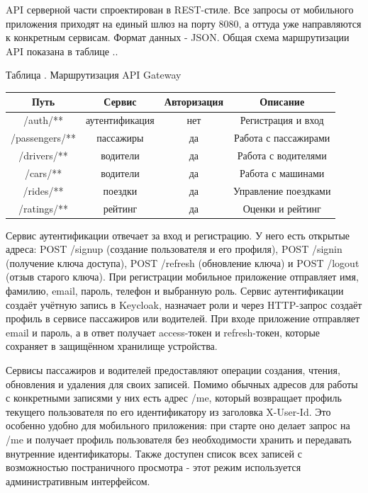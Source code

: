 {\gostFont
	
	\par \redline API серверной части спроектирован в REST-стиле. Все запросы от мобильного приложения приходят на единый шлюз на порту 8080, а оттуда уже направляются к конкретным сервисам. Формат данных - JSON. Общая схема маршрутизации API показана в таблице \thechaptercntr .\thetablecntr.
	
	\topTablespace
	{\begin{Center}
			\par Таблица \thechaptercntr .\thetablecntr \spc {--} Маршрутизация API Gateway
			
			\begin{tabular}{|c|c|c|c|}
				\hline
				Путь & Сервис & Авторизация & Описание \\ \hline
				/auth/** & аутентификация & нет & Регистрация и вход \\ \hline
				/passengers/** & пассажиры & да & Работа с пассажирами \\ \hline
				/drivers/** & водители & да & Работа с водителями \\ \hline
				/cars/** & водители & да & Работа с машинами \\ \hline
				/rides/** & поездки & да & Управление поездками \\ \hline
				/ratings/** & рейтинг & да & Оценки и рейтинг \\ \hline
		\end{tabular} \end{Center}}
	\botTablespace \addtocounter{tablecntr}{1}
	
	\par \redline Сервис аутентификации отвечает за вход и регистрацию. У него есть открытые адреса: POST /signup (создание пользователя и его профиля), POST /signin (получение ключа доступа), POST /refresh (обновление ключа) и POST /logout (отзыв старого ключа). При регистрации мобильное приложение отправляет имя, фамилию, email, пароль, телефон и выбранную роль. Сервис аутентификации создаёт учётную запись в Keycloak, назначает роли и через HTTP-запрос создаёт профиль в сервисе пассажиров или водителей. При входе приложение отправляет email и пароль, а в ответ получает access-токен и refresh-токен, которые сохраняет в защищённом хранилище устройства.
	
	\par \redline Сервисы пассажиров и водителей предоставляют операции создания, чтения, обновления и удаления для своих записей. Помимо обычных адресов для работы с конкретными записями у них есть адрес /me, который возвращает профиль текущего пользователя по его идентификатору из заголовка X-User-Id. Это особенно удобно для мобильного приложения: при старте оно делает запрос на /me и получает профиль пользователя без необходимости хранить и передавать внутренние идентификаторы. Также доступен список всех записей с возможностью постраничного просмотра - этот режим используется административным интерфейсом.
	
}
